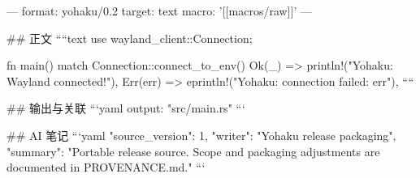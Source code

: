 ---
format: yohaku/0.2
target: text
macro: '[[macros/raw]]'
---

## 正文
````text
use wayland_client::Connection;

fn main() {
    match Connection::connect_to_env() {
        Ok(_) => println!("Yohaku: Wayland connected!"),
        Err(err) => eprintln!("Yohaku: connection failed: {err}"),
    }
}
````

## 输出与关联
```yaml
output: "src/main.rs"
```

## AI 笔记
```yaml
{"source_version": 1, "writer": "Yohaku release packaging", "summary": "Portable release source. Scope and packaging adjustments are documented in PROVENANCE.md."}
```
